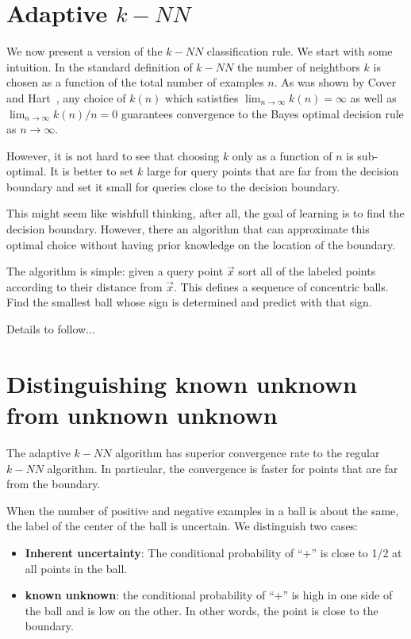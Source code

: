 \documentclass{colt2019} %
\newcommand{\x}{\vec{x}}
\begin{document}
\section{Adaptive $k-NN$}

We now present a version of the $k-NN$ classification rule. We start
with some intuition. In the standard definition of $k-NN$ the number
of neightbors $k$ is chosen as a function of the total number of
examples $n$. As was shown by Cover and Hart~\cite{}, any choice of
$k(n)$ which satistfies $\lim_{n \to \infty}k(n)=\infty$ as well as
$\lim_{n \to \infty}k(n)/n =0$ guarantees convergence to the Bayes
optimal decision rule as $n \to \infty$.

However, it is not hard to see that choosing $k$ only as a function of
$n$ is sub-optimal. It is better to set $k$ large for query points
that are far from the decision boundary and set it small for queries
close to the decision boundary.

This might seem like wishfull thinking, after all, the goal of
learning is to find the decision boundary. However, there an algorithm
that can approximate this optimal choice without having prior
knowledge on the location of the boundary.

The algorithm is simple: given a query point $\x$ sort all of the labeled
points according to their distance from $\x$. This defines a sequence
of concentric balls. Find the smallest ball whose sign is determined
and predict with that sign.

Details to follow...

\section{Distinguishing known unknown from unknown unknown}

The adaptive $k-NN$ algorithm has superior convergence rate to the
regular $k-NN$ algorithm. In particular, the convergence is faster for
points that are far from the boundary.

When the number of positive and negative examples in a ball is about
the same, the label of the center of the ball is uncertain. We
distinguish two cases:
\begin{itemize}
\item {\bf Inherent uncertainty}: The conditional probability of ``+'' is
  close to 1/2 at all points in the ball.
\item {\bf known unknown}: the conditional probability of ``+'' is
  high in one side of the ball and is low on the other. In other
  words, the point is close to the boundary.
\end{itemize}
\end{document}
